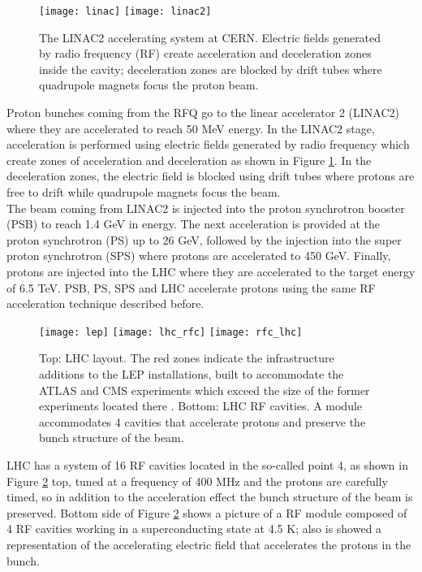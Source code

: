 \begin{figure}[!h]
  \centering
  \texttt{[image: linac]}
  \texttt{[image: linac2]}
  \caption [The LINAC2 accelerating system at CERN.]{The LINAC2 accelerating system at CERN. Electric fields generated by radio frequency (RF) create acceleration and deceleration zones inside the cavity; deceleration zones are blocked by drift tubes where quadrupole magnets focus the proton beam. \cite{linac}}\label{fig:linac}
\end{figure}

\noindent Proton bunches coming from the RFQ go to the linear accelerator 2 (LINAC2) where they are accelerated to reach 50 MeV energy. In the LINAC2 stage, acceleration is performed using electric fields generated by radio frequency which create zones of acceleration and deceleration as shown in Figure \ref{fig:linac}. In the deceleration zones, the electric field is blocked using drift tubes where protons are free to drift while quadrupole magnets focus the beam.\\   

\noindent The beam coming from LINAC2 is injected into the proton synchrotron booster (PSB) to reach 1.4 GeV in energy. The next acceleration is provided at the proton synchrotron (PS) up to 26 GeV, followed by the injection into the super proton synchrotron (SPS) where protons are accelerated to 450 GeV. Finally, protons are injected into the LHC where they are accelerated to the target energy of 6.5 TeV.
\noindent PSB, PS, SPS and LHC accelerate protons using the same RF acceleration technique described before. 

\begin{figure}[!h]
\centering
\texttt{[image: lep]}
\texttt{[image: lhc\_rfc]}
\texttt{[image: rfc\_lhc]}
\caption[LHC layout and RF cavities module.]{Top: LHC layout. The red zones indicate the infrastructure additions to the LEP installations, built to accommodate the ATLAS and CMS experiments which exceed the size of the former experiments located there \cite{lep}. Bottom: LHC RF cavities. A module accommodates 4 cavities that accelerate protons and preserve the bunch structure of the beam. \cite{video,lhc_rfc}}\label{fig:lep_rfc}
\end{figure}

\noindent LHC has a system of 16 RF cavities located in the so-called point 4, as shown in Figure \ref{fig:lep_rfc} top, tuned at a frequency of 400 MHz and the protons are carefully timed, so in addition to the acceleration effect the bunch structure of the beam is preserved. Bottom side of Figure \ref{fig:lep_rfc} shows a picture of a RF module composed of 4 RF cavities working in a superconducting state at 4.5 K; also is showed a representation of the accelerating electric field that accelerates the protons in the bunch.\\ 

